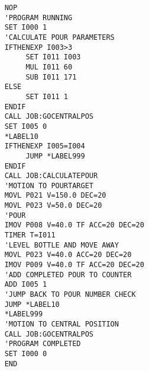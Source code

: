 \begin{verbatim}
    NOP
    'PROGRAM RUNNING
    SET I000 1
    'CALCULATE POUR PARAMETERS
    IFTHENEXP I003>3
         SET I011 I003
         MUL I011 60
         SUB I011 171
    ELSE
         SET I011 1
    ENDIF
    CALL JOB:GOCENTRALPOS
    SET I005 0
    *LABEL10
    IFTHENEXP I005=I004
         JUMP *LABEL999
    ENDIF
    CALL JOB:CALCULATEPOUR
    'MOTION TO POURTARGET
    MOVL P021 V=150.0 DEC=20
    MOVL P023 V=50.0 DEC=20
    'POUR
    IMOV P008 V=40.0 TF ACC=20 DEC=20
    TIMER T=I011
    'LEVEL BOTTLE AND MOVE AWAY
    MOVL P023 V=40.0 ACC=20 DEC=20
    IMOV P009 V=40.0 TF ACC=20 DEC=20
    'ADD COMPLETED POUR TO COUNTER
    ADD I005 1
    'JUMP BACK TO POUR NUMBER CHECK
    JUMP *LABEL10
    *LABEL999
    'MOTION TO CENTRAL POSITION
    CALL JOB:GOCENTRALPOS
    'PROGRAM COMPLETED
    SET I000 0
    END
\end{verbatim}
